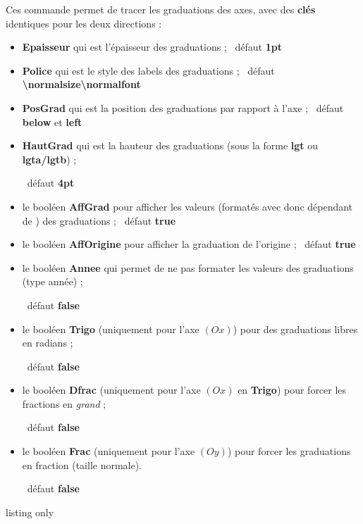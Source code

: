 \documentclass[a4paper,french,11pt]{article}
\newcommand\ctex[1]{\tcbox[vignettelatex]{#1}}
\newcommand\cmaj[1]{%
	{\tcbox[vignetteMaJ]{#1}\xspace}%
}
\newcommand\Cle[1]{{\bfseries\sffamily\textlangle \textcolor{orange!75!black}{#1}\textrangle}}
\begin{document}
\begin{cautionblock}
Ces commande permet de tracer les graduations des axes, avec des \Cle{clés} identiques pour les deux directions :

\begin{itemize}
	\item \Cle{Epaisseur} qui est l'épaisseur des graduations ; \hfill~défaut \Cle{1pt}
	\item \Cle{Police} qui est le style des labels des graduations ; \hfill~défaut \Cle{\textbackslash{}normalsize\textbackslash{}normalfont}
	\item \Cle{PosGrad} qui est la position des graduations par rapport à l'axe ; \hfill~défaut \Cle{below} et \Cle{left}
	\item \Cle{HautGrad} qui est la hauteur des graduations (sous la forme \Cle{lgt} ou \Cle{lgta/lgtb}) ;
	
	\hfill~défaut \Cle{4pt}
	\item le booléen \Cle{AffGrad} pour afficher les valeurs (formatés avec \ctex{num} donc dépendant de \ctex{sisetup}) des graduations  ; \hfill~défaut \Cle{true}
	\item le booléen \Cle{AffOrigine} pour afficher la graduation de l'origine ; \hfill~défaut \Cle{true}
	\item le booléen \Cle{Annee} qui permet de ne pas formater les valeurs des graduations (type \textsf{année}) ;
	
	\hfill~défaut \Cle{false}
	\item \cmaj{2.5.6} le booléen \Cle{Trigo} (uniquement pour l'axe $(Ox)$) pour des graduations libres en radians ;
	
	\hfill~défaut \Cle{false}
	\item \cmaj{2.5.6} le booléen \Cle{Dfrac} (uniquement pour l'axe $(Ox)$ en \Cle{Trigo}) pour forcer les fractions en \textit{grand} ;
	
	\hfill~défaut \Cle{false}
	\item \cmaj{2.7.0} le booléen \Cle{Frac} (uniquement pour l'axe $(Oy)$) pour forcer les graduations en fraction (taille normale).
	
	\hfill~défaut \Cle{false}
\end{itemize}
\vspace*{-\baselineskip}\leavevmode
\end{cautionblock}

\begin{PresCodeTexPL}{listing only}
\end{PresCodeTexPL}
\end{document}
